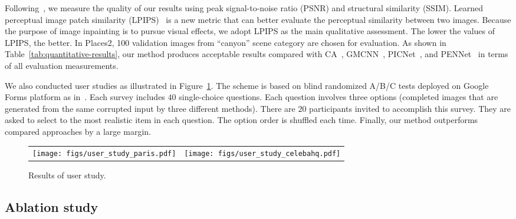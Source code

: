 \documentclass[journal]{IEEEtran}
\begin{document}
Following~\cite{contextual-attention,GMCNN}, we measure the quality of our results using peak signal-to-noise ratio (PSNR) and structural similarity (SSIM). Learned perceptual image patch similarity (LPIPS)~\cite{LPIPS} is a new metric that can better evaluate the perceptual similarity between two images. Because the purpose of image inpainting is to pursue visual effects, we adopt LPIPS as the main qualitative assessment. The lower the values of LPIPS, the better. In Places2, 100 validation images from ``canyon'' scene category are chosen for evaluation. As shown in Table~\ref{tab:quantitative-results}, our method produces acceptable results compared with CA~\cite{contextual-attention}, GMCNN~\cite{GMCNN}, PICNet~\cite{PICNet}, and PENNet~\cite{PEN-Net} in terms of all evaluation measurements. 

We also conducted user studies as illustrated in Figure~\ref{fig:user-study}. The scheme is based on blind randomized A/B/C tests deployed on Google Forms platform as in~\cite{GMCNN}. Each survey includes $40$ single-choice questions. Each question involves three options (completed images that are generated from the same corrupted input by three different methods). There are $20$ participants invited to accomplish this survey. They are asked to select to the most realistic item in each question. The option order is shuffled each time. Finally, our method outperforms compared approaches by a large margin.

\begin{figure}[htpb]
	\centering
	\begin{tabular}{cc}
		\texttt{[image: figs/user\_study\_paris.pdf]} &
		\texttt{[image: figs/user\_study\_celebahq.pdf]} \\
	\end{tabular}
	\caption{Results of user study.}
	\label{fig:user-study}
\end{figure}

\subsection{Ablation study}

\begin{table}[htpb]
	\centering
	\caption{Quantitative results of different structures on Paris street view dataset (center regular mask).}
	\label{tab:different-structures}
\end{table}
\end{document}
